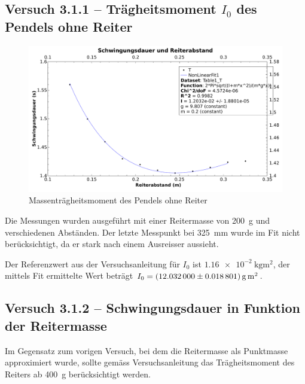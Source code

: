 \subsection{Versuch 3.1.1 -- Tr\"agheitsmoment $I_0$ des Pendels ohne Reiter}
\label{subsec:i0}

\begin{figure}[h!]
    \centering
    \includegraphics[width=\textwidth]{images/311.pdf}
    \caption{%
        Massentr\"agheitsmoment des Pendels ohne Reiter
    }
    \label{fig:pendelKonfigs}
\end{figure}

Die Messungen  wurden ausgef\"uhrt  mit einer Reitermasse  von \SI{200}{\gram}
und verschiedenen Abst\"anden. Der letzte Messpunkt bei \SI{325}{\milli\meter}
wurde  im  Fit nicht  ber\"ucksichtigt,  da  er  stark nach  einem  Ausreisser
aussieht.

Der Referenzwert aus der Versuchsanleitung f\"ur $I_0$ ist $\SI{1.16e-2}{\kilo\gram\meter\squared}$,
der mittels Fit ermittelte Wert betr\"agt $I_0  = \SI[separate-uncertainty = true]{12.032 \pm 0.018801}{\gram\meter\squared}$.


\clearpage
\subsection{Versuch 3.1.2 -- Schwingungsdauer in Funktion der Reitermasse}
\label{subsec:periodeReitermasse}

Im  Gegensatz zum  vorigen Versuch,  bei  dem die  Reitermasse als  Punktmasse
approximiert  wurde, sollte  gem\"ass Versuchsanleitung  das Tr\"agheitsmoment
des Reiters ab \SI{400}{\gram} ber\"ucksichtigt werden.

